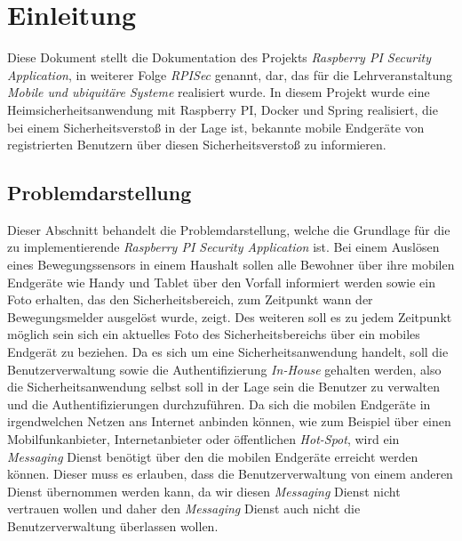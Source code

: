 \section{Einleitung}
Diese Dokument stellt die Dokumentation des Projekts \emph{Raspberry PI Security Application}, in weiterer Folge \emph{RPISec} genannt, dar, das für die Lehrveranstaltung \emph{Mobile und ubiquitäre Systeme} realisiert wurde. In diesem Projekt wurde eine Heimsicherheitsanwendung mit Raspberry PI, Docker und Spring realisiert, die bei einem Sicherheitsverstoß in der Lage ist, bekannte mobile Endgeräte von registrierten Benutzern über diesen Sicherheitsverstoß zu informieren. 

\subsection{Problemdarstellung}
Dieser Abschnitt behandelt die Problemdarstellung, welche die Grundlage für die zu implementierende \emph{Raspberry PI Security Application} ist. Bei einem Auslösen eines Bewegungssensors in einem Haushalt sollen alle Bewohner über ihre mobilen Endgeräte wie Handy und Tablet über den Vorfall informiert werden sowie ein Foto erhalten, das den Sicherheitsbereich, zum Zeitpunkt wann der Bewegungsmelder ausgelöst wurde, zeigt. Des weiteren soll es zu jedem Zeitpunkt möglich sein sich ein aktuelles Foto des Sicherheitsbereichs über ein mobiles Endgerät zu beziehen.  
\newline
\newline
Da es sich um eine Sicherheitsanwendung handelt, soll die Benutzerverwaltung sowie die Authentifizierung \emph{In-House} gehalten werden, also die Sicherheitsanwendung selbst soll in der Lage sein die Benutzer zu verwalten und die Authentifizierungen durchzuführen. Da sich die mobilen Endgeräte in irgendwelchen Netzen ans Internet anbinden können, wie zum Beispiel über einen Mobilfunkanbieter, Internetanbieter oder öffentlichen \emph{Hot-Spot}, wird ein \emph{Messaging} Dienst benötigt über den die mobilen Endgeräte erreicht werden können. Dieser muss es erlauben, dass die Benutzerverwaltung von einem anderen Dienst übernommen werden kann, da wir diesen \emph{Messaging} Dienst nicht vertrauen wollen und daher den \emph{Messaging} Dienst auch nicht die Benutzerverwaltung überlassen wollen.


